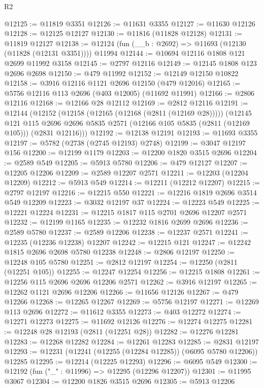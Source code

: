 \begin{lexlean}{R2}
\begin{coremodule}
@12125 := @11819 @3351
@12126 := @11631 @3355
@12127 := @11630 @12126
@12128 := @12125 @12127
@12130 := @11816 (@11828 @12128)
@12131 := @11819 @12127
@12138 := @12124 (fun (__b : @2692) => @11693 (@12130 (@11828 (@12131 @3351)))) @11994
@12144 := @10694 @12116 @1808 @121 @2699 @11992 @3158
@12145 := @2797 @12116
@12149 := @12145 @1808 @123 @2696 @2698
@12150 := @479 @11992
@12152 := @12149 @12150 @10822
@12158 := @3916 @12116 @1121 @2696 @12150 (@479 @12016)
@12165 := @5756 @12116 @113 @2696 (@403 @12005) (@11692 @11991)
@12166 := @2806 @12116
@12168 := @12166 @28 @12112
@12169 := @2812 @12116
@12191 := @12144
    (@12152
      (@12158 (@12165 (@12168 (@2811 (@12169 @28)))))
      (@12145
        @121
        @115
        @2696
        @2696
        @5835
        @2571
        (@12166 @105 @5835 (@2811 (@12169 @105)))
        (@2831 @12116)))
@12192 := @12138 @12191
@12193 := @11693 @3355
@12197 := @5782 (@2738 (@2745 @12193) @2748)
@12199 := @3047 @12197 @156
@12200 := @12199 @1179
@12203 := @12200 @1820 @3515 @2696
@12204 := @2589 @549
@12205 := @5913 @5780
@12206 := @479 @12127
@12207 := @12205 @12206
@12209 := @2589 @12207 @2571
@12211 := @12203 (@12204 @12209)
@12212 := @5913 @549
@12214 := @12211 (@12212 @12207)
@12215 := @2797 @12197
@12216 := @12215 @550
@12221 := @12216 @1819 @2696 @3514 @549 @12209
@12223 := @3032 @12197 @37
@12224 := @12223 @549
@12225 := @12221 @12224
@12231 := @12215 @1817 @115 @2701 @2696 @12207 @2571
@12232 := @12199 @1165
@12235 := @12232 @1816 @2699 @2696
@12236 := @2589 @5780
@12237 := @2589 @12206
@12238 := @12237 @2571
@12241 := @12235 (@12236 @12238) @12207
@12242 := @12215 @121
@12247 := @12242 @1815 @2696 @2698 @5780 @12238
@12248 := @2806 @12197
@12250 := @12248 @105 @5780
@12251 := @2812 @12197
@12254 := @12250 (@2811 (@12251 @105))
@12255 := @12247 @12254
@12256 := @12215 @1808
@12261 := @12256 @115 @2696 @2696 @12206 @2571
@12262 := @3916 @12197
@12265 := @12262 @1121 @2696 @12206
@12266 := @11656 @12126
@12267 := @479 @12266
@12268 := @12265 @12267
@12269 := @5756 @12197
@12271 := @12269 @113 @2696
@12272 := @11612 @3355
@12273 := @403 @12272
@12274 := @12271 @12273
@12275 := @11692 @12126
@12276 := @12274 @12275
@12281 := @12248 @28 @12193 (@2811 (@12251 @28))
@12282 := @12276 @12281
@12283 := @12268 @12282
@12284 := @12261 @12283
@12285 := @2831 @12197
@12293 := @12231 (@12241 (@12255 (@12284 @12285)) (@6095 @5780 @12206)) @12285
@12295 := @12214 (@12225 @12293)
@12296 := @6095 @549
@12300 := @12192 (fun ("_" : @11996) => @12295 (@12296 @12207))
@12301 := @11995 @3067
@12304 := @12200 @1826 @3515 @2696
@12305 := @5913 @12206

\end{coremodule}
\end{lexlean}
